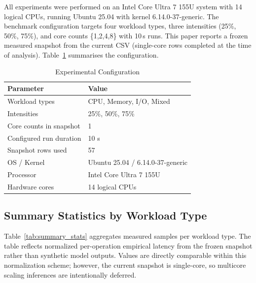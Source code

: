 \documentclass[conference]{IEEEtran}
\begin{document}
All experiments were performed on an Intel Core Ultra 7 155U system with
14 logical CPUs, running Ubuntu 25.04 with kernel 6.14.0-37-generic.  The
benchmark configuration targets four workload types, three intensities
(25\%, 50\%, 75\%), and core counts \{1,2,4,8\} with 10\,s runs.
This paper reports a frozen measured snapshot from the current CSV
(single-core rows completed at the time of analysis).
Table~\ref{tab:setup} summarises the configuration.

\begin{table}[htbp]
\caption{Experimental Configuration}
\label{tab:setup}
\begin{center}
\begin{tabular}{ll}
\toprule
\textbf{Parameter} & \textbf{Value} \\
\midrule
Workload types     & CPU, Memory, I/O, Mixed \\
Intensities        & 25\%, 50\%, 75\% \\
Core counts in snapshot & 1 \\
Configured run duration & 10 s \\
Snapshot rows used & 57 \\
OS / Kernel        & Ubuntu 25.04 / 6.14.0-37-generic \\
Processor          & Intel Core Ultra 7 155U \\
Hardware cores     & 14 logical CPUs \\
\bottomrule
\end{tabular}
\end{center}
\end{table}

\subsection{Summary Statistics by Workload Type}
\label{subsec:summary_stats}

Table~\ref{tab:summary_stats} aggregates measured samples per workload type.
The table reflects normalized per-operation empirical latency from the frozen
snapshot rather than synthetic model outputs.  Values are directly comparable
within this normalization scheme; however, the current snapshot is single-core,
so multicore scaling inferences are intentionally deferred.
\end{document}

